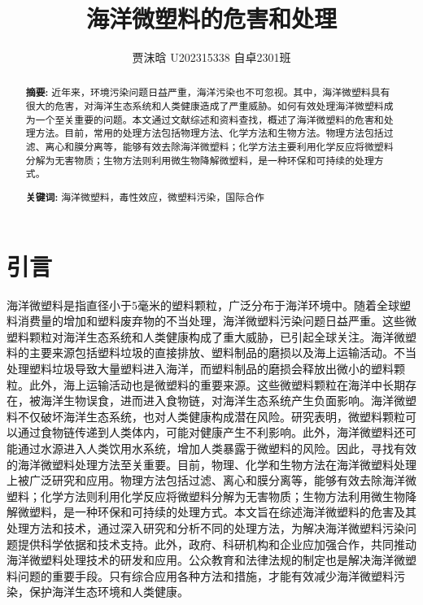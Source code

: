 \documentclass{article}
\title{\heiti 海洋微塑料的危害和处理}
\author{贾沫晗 U202315338 自卓2301班}
\begin{document}
	\maketitle
	\tableofcontents
	
	\begin{abstract}
		\textbf{ 摘要:} 近年来，环境污染问题日益严重，海洋污染也不可忽视。其中，海洋微塑料具有很大的危害，对海洋生态系统和人类健康造成了严重威胁。如何有效处理海洋微塑料成为一个至关重要的问题。本文通过文献综述和资料查找，概述了海洋微塑料的危害和处理方法。目前，常用的处理方法包括物理方法、化学方法和生物方法。物理方法包括过滤、离心和膜分离等，能够有效去除海洋微塑料；化学方法主要利用化学反应将微塑料分解为无害物质；生物方法则利用微生物降解微塑料，是一种环保和可持续的处理方式。
		
		\textbf{关键词:} 海洋微塑料，毒性效应，微塑料污染，国际合作
	\end{abstract}

    
    
    \section{引言} 海洋微塑料是指直径小于5毫米的塑料颗粒，广泛分布于海洋环境中。随着全球塑料消费量的增加和塑料废弃物的不当处理，海洋微塑料污染问题日益严重。这些微塑料颗粒对海洋生态系统和人类健康构成了重大威胁，已引起全球关注。海洋微塑料的主要来源包括塑料垃圾的直接排放、塑料制品的磨损以及海上运输活动。不当处理塑料垃圾导致大量塑料进入海洋，而塑料制品的磨损会释放出微小的塑料颗粒。此外，海上运输活动也是微塑料的重要来源。这些微塑料颗粒在海洋中长期存在，被海洋生物误食，进而进入食物链，对海洋生态系统产生负面影响。海洋微塑料不仅破坏海洋生态系统，也对人类健康构成潜在风险。研究表明，微塑料颗粒可以通过食物链传递到人类体内，可能对健康产生不利影响。此外，海洋微塑料还可能通过水源进入人类饮用水系统，增加人类暴露于微塑料的风险。因此，寻找有效的海洋微塑料处理方法至关重要。目前，物理、化学和生物方法在海洋微塑料处理上被广泛研究和应用。物理方法包括过滤、离心和膜分离等，能够有效去除海洋微塑料；化学方法则利用化学反应将微塑料分解为无害物质；生物方法利用微生物降解微塑料，是一种环保和可持续的处理方式。本文旨在综述海洋微塑料的危害及其处理方法和技术，通过深入研究和分析不同的处理方法，为解决海洋微塑料污染问题提供科学依据和技术支持。此外，政府、科研机构和企业应加强合作，共同推动海洋微塑料处理技术的研发和应用。公众教育和法律法规的制定也是解决海洋微塑料问题的重要手段。只有综合应用各种方法和措施，才能有效减少海洋微塑料污染，保护海洋生态环境和人类健康。
\end{document}
